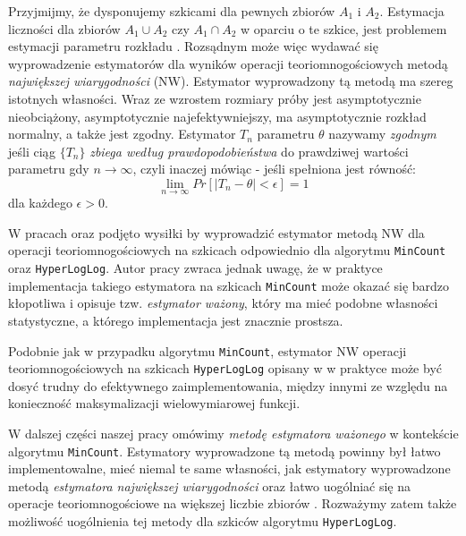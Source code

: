        Przyjmijmy, że dysponujemy szkicami dla pewnych zbiorów $A_1$ i $A_2$. Estymacja liczności dla zbiorów $A_1 \cup A_2$ czy 
       $A_1 \cap A_2$ w oparciu o te szkice, jest problemem estymacji parametru rozkładu \cite{ting}. Rozsądnym może więc wydawać się wyprowadzenie estymatorów dla wyników operacji teoriomnogościowych metodą \textit{największej wiarygodności} (NW).
       Estymator wyprowadzony tą metodą ma szereg istotnych własności. Wraz ze wzrostem rozmiary próby jest asymptotycznie nieobciążony, asymptotycznie najefektywniejszy, ma asymptotycznie rozkład normalny, a także jest zgodny. Estymator $T_n$ parametru $\theta$ nazywamy \textit{zgodnym} jeśli ciąg $\{T_n\}$ \textit{zbiega według prawdopodobieństwa} 
        do prawdziwej wartości parametru gdy $n \rightarrow \infty$, czyli inaczej mówiąc - jeśli spełniona jest równość:
       \begin{equation}
     		\lim_{n \to \infty} Pr[|T_n - \theta| < \epsilon] = 1
     		\label{consistent_def}
       \end{equation}
       dla każdego $\epsilon > 0$.
%       
      
      W pracach \cite{ting} oraz \cite{oertl} podjęto wysiłki
      by wyprowadzić estymator metodą NW dla operacji teoriomnogościowych na szkicach odpowiednio dla algorytmu \texttt{MinCount} oraz \texttt{HyperLogLog}.
      Autor pracy \cite{ting} zwraca jednak uwagę, że
      w praktyce implementacja takiego estymatora na szkicach \texttt{MinCount} może okazać się bardzo kłopotliwa i opisuje tzw. \textit{estymator ważony}, który ma  mieć podobne własności statystyczne, a którego implementacja jest znacznie prostsza. 
  
 Podobnie jak w przypadku algorytmu \texttt{MinCount}, estymator NW operacji teoriomnogościowych na szkicach \texttt{HyperLogLog} opisany w 
 \cite{oertl} w praktyce może być dosyć trudny do efektywnego zaimplementowania, między innymi ze względu na konieczność maksymalizacji wielowymiarowej funkcji.
       
        W dalszej części naszej pracy omówimy  \textit{metodę estymatora ważonego} w kontekście algorytmu 
        \texttt{MinCount}. 
        Estymatory wyprowadzone tą metodą powinny był łatwo implementowalne, mieć niemal te same własności, jak estymatory wyprowadzone metodą \textit{estymatora największej wiarygodności} oraz łatwo uogólniać się na operacje teoriomnogościowe na większej liczbie zbiorów \cite{ting}.         
        Rozważymy zatem także  możliwość uogólnienia tej metody  dla szkiców algorytmu \texttt{HyperLogLog}.
        
        

       
       
       
